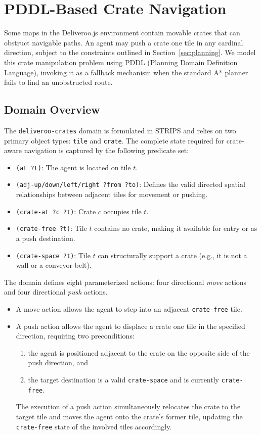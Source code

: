 \section{PDDL-Based Crate Navigation}
\label{sec:pddl}
Some maps in the Deliveroo.js environment contain movable crates that can obstruct navigable paths. 
An agent may push a crate one tile in any cardinal direction, subject to the constraints outlined in Section~\ref{sec:planning}. 
We model this crate manipulation problem using PDDL (Planning Domain Definition Language), invoking it as a fallback mechanism when the standard A* planner fails to find an unobstructed route.

\subsection{Domain Overview}
The \texttt{deliveroo-crates} domain is formulated in STRIPS and relies on two primary object types: \texttt{tile} and \texttt{crate}. The complete state required for crate-aware navigation is captured by the following predicate set:
\begin{itemize}[noitemsep]
  \item \texttt{(at ?t)}: The agent is located on tile $t$.
  \item \texttt{(adj-up/down/left/right ?from ?to)}: Defines the valid directed spatial relationships between adjacent tiles for movement or pushing.
  \item \texttt{(crate-at ?c ?t)}: Crate $c$ occupies tile $t$.
  \item \texttt{(crate-free ?t)}: Tile $t$ contains no crate, making it available for entry or as a push destination.
  \item \texttt{(crate-space ?t)}: Tile $t$ can structurally support a crate (e.g., it is not a wall or a conveyor belt).
\end{itemize}

The domain defines eight parameterized actions: four directional \emph{move} actions and four directional \emph{push} actions.
\begin{itemize}
    \item A move action allows the agent to step into an adjacent \texttt{crate-free} tile. 
    \item A push action allows the agent to displace a crate one tile in the specified direction, requiring two preconditions:
    \begin{enumerate}[label=(\roman*)]
        \item the agent is positioned adjacent to the crate on the opposite side of the push direction, and
        \item the target destination is a valid \texttt{crate-space} and is currently \texttt{crate-free}. 
    \end{enumerate}
    The execution of a push action simultaneously relocates the crate to the target tile and moves the agent onto the crate's former tile, updating the \texttt{crate-free} state of the involved tiles accordingly.
\end{itemize}


